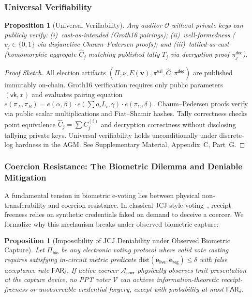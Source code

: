\documentclass[10pt,letterpaper,journal]{IEEEtran}
\newtheorem{proposition}[theorem]{Proposition}
\begin{document}
\subsubsection{Universal Verifiability}
\label{sec:verifiability}

\begin{proposition}[Universal Verifiability]
\label{prop:verif}
Any auditor $\mathcal{O}$ without private keys can publicly verify: (i)~cast-as-intended (Groth16 pairings); (ii)~well-formedness ($v_j \in \{0,1\}$ via disjunctive Chaum--Pedersen proofs); and (iii)~tallied-as-cast (homomorphic aggregate $\hat{C}_j$ matching published tally $T_j$ via decryption proof $\pi_j^{\mathsf{dec}}$).
\end{proposition}

\begin{proof}[Proof Sketch]
All election artifacts $(\Pi, \nu, E(\mathbf{v}), \pi^{\mathsf{val}}, \hat{C}, \pi^{\mathsf{dec}})$ are published immutably on-chain. Groth16 verification requires only public parameters $(\mathsf{vk}, x)$ and evaluates pairing equation $e(\pi_A,\pi_B) = e(\alpha,\beta)\cdot e(\sum a_i L_i,\gamma)\cdot e(\pi_C,\delta)$. Chaum--Pedersen proofs verify via public scalar multiplications and Fiat--Shamir hashes. Tally correctness checks point equivalence $\hat{C}_j = \sum C^{(i)}_j$ and decryption correctness without disclosing tallying private keys. Universal verifiability holds unconditionally under discrete-log hardness in the AGM. See Supplementary Material, Appendix~C, Part~G.
\end{proof}

\subsubsection{Coercion Resistance: The Biometric Dilemma and Deniable Mitigation}
\label{sec:coercion}

A fundamental tension in biometric e-voting lies between physical non-transferability and coercion resistance. In classical JCJ-style voting~\cite{Juels2005,Civitas2008}, receipt-freeness relies on synthetic credentials faked on demand to deceive a coercer. We formalize why this mechanism breaks under observed biometric capture:

\begin{proposition}[Impossibility of JCJ Deniability under Observed Biometric Capture]
\label{prop:coercion-impossibility}
Let $\Pi_{\mathsf{bio}}$ be any electronic voting protocol where valid vote casting requires satisfying in-circuit metric predicate $\mathrm{dist}(\mathbf{e}_{\mathsf{live}}, \mathbf{e}_{\mathsf{reg}}) \leq \delta$ with false acceptance rate $\mathsf{FAR}_\delta$. If active coercer $\mathcal{A}_{\mathsf{coer}}$ physically observes trait presentation at the capture device, no PPT voter $\mathcal{V}$ can achieve information-theoretic receipt-freeness or unobservable credential forgery, except with probability at most $\mathsf{FAR}_\delta$.
\end{proposition}
\end{document}
